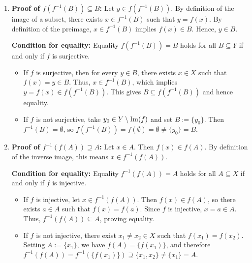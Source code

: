\begin{exercisesolution}
\label{sol:images_preimages_operations}
\begin{enumerate}[label=\textbf{(\alph*)}]
    \item \textbf{Proof of $f(f^{-1}(B)) \subseteq B$:} Let $y \in f(f^{-1}(B))$. By definition of the image of a subset, there exists $x \in f^{-1}(B)$ such that $y = f(x)$. By definition of the preimage, $x \in f^{-1}(B)$ implies $f(x) \in B$. Hence, $y \in B$.
    
    \textbf{Condition for equality:} Equality $f(f^{-1}(B)) = B$ holds for all $B \subseteq Y$ if and only if $f$ is surjective.
    \begin{itemize}
        \item If $f$ is surjective, then for every $y \in B$, there exists $x \in X$ such that $f(x) = y \in B$. Thus, $x \in f^{-1}(B)$, which implies $y = f(x) \in f(f^{-1}(B))$. This gives $B \subseteq f(f^{-1}(B))$ and hence equality.
        \item If $f$ is not surjective, take $y_0 \in Y \setminus \operatorname{Im}(f)$ and set $B := \{y_0\}$. Then $f^{-1}(B) = \emptyset$, so $f(f^{-1}(B)) = f(\emptyset) = \emptyset \ne \{y_0\} = B$.
    \end{itemize}

    \item \textbf{Proof of $f^{-1}(f(A)) \supseteq A$:} Let $x \in A$. Then $f(x) \in f(A)$. By definition of the inverse image, this means $x \in f^{-1}(f(A))$.
    
    \textbf{Condition for equality:} Equality $f^{-1}(f(A)) = A$ holds for all $A \subseteq X$ if and only if $f$ is injective.
    \begin{itemize}
        \item If $f$ is injective, let $x \in f^{-1}(f(A))$. Then $f(x) \in f(A)$, so there exists $a \in A$ such that $f(x) = f(a)$. Since $f$ is injective, $x = a \in A$. Thus, $f^{-1}(f(A)) \subseteq A$, proving equality.
        \item If $f$ is not injective, there exist $x_1 \ne x_2 \in X$ such that $f(x_1) = f(x_2)$. Setting $A := \{x_1\}$, we have $f(A) = \{f(x_1)\}$, and therefore $f^{-1}(f(A)) = f^{-1}(\{f(x_1)\}) \supseteq \{x_1, x_2\} \ne \{x_1\} = A$.
    \end{itemize}


\end{enumerate}
\end{exercisesolution}
